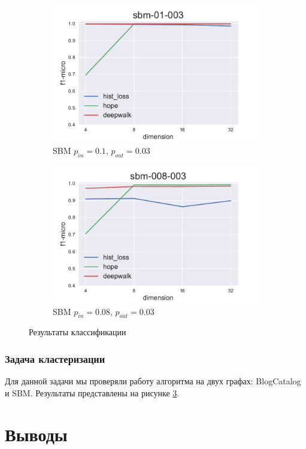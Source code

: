 \documentclass[12pt,a4paper]{extarticle}
\begin{document}
\begin{figure}
\begin{subfigure}{.5\linewidth}
    \includegraphics[width=\linewidth]{src/images/Node_classification_sbm-01-003.pdf}
    \caption{SBM $p_{in}=0.1$, $p_{out}=0.03$}
    \label{fig:clas_sbm2}
    \end{subfigure}
    \begin{subfigure}{.5\linewidth}
    \centering
    \includegraphics[width=\linewidth]{src/images/Node_classification_sbm-008-003.pdf}
    \caption{SBM $p_{in}=0.08$, $p_{out}=0.03$}
    \label{fig:clas_sbm3}
    \end{subfigure}
    \caption{Результаты классификации}
    \label{fig:clas}
    \end{figure}
    
    \subsubsection{Задача кластеризации}

    Для данной задачи мы проверяли работу алгоритма на двух графах: BlogCatalog и SBM. Результаты представлены на рисунке \ref{fig:clas}.
    
    \section{Выводы}
    
    
    
\end{document}
